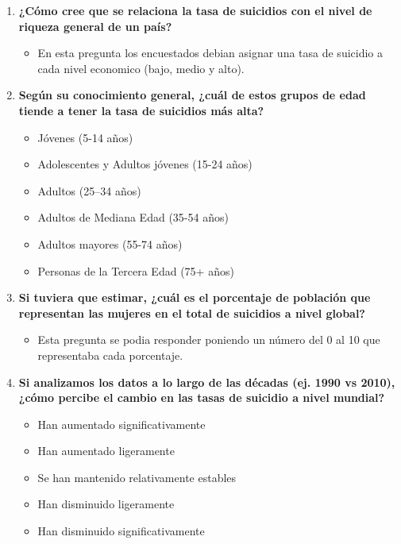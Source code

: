 \documentclass[12pt, letterpaper]{article}
\begin{document}
\begin{enumerate}
  \item \textbf{¿Cómo cree que se relaciona la tasa de suicidios con el nivel de riqueza general
        de un país?}
        \begin{itemize}[nosep]
          \item En esta pregunta los encuestados debian asignar una tasa de suicidio a cada nivel economico (bajo, medio y alto).
        \end{itemize}

  \item \textbf{Según su conocimiento general, ¿cuál de estos grupos de edad tiende a tener
        la tasa de suicidios más alta?}
        \begin{itemize}[nosep]
          \item Jóvenes (5-14 años)
          \item Adolescentes y Adultos jóvenes (15-24 años)
          \item Adultos (25--34 años)
          \item Adultos de Mediana Edad (35-54 años)
          \item Adultos mayores (55-74 años)
          \item Personas de la Tercera Edad (75+ años)
        \end{itemize}

  \item \textbf{Si tuviera que estimar, ¿cuál es el porcentaje de población que representan
        las mujeres en el total de suicidios a nivel global?}
        \begin{itemize}[nosep]
          \item Esta pregunta se podia responder poniendo un número del 0 al 10 que representaba cada porcentaje.
        \end{itemize}

  \item \textbf{Si analizamos los datos a lo largo de las décadas (ej. 1990 vs 2010), ¿cómo
        percibe el cambio en las tasas de suicidio a nivel mundial?}
        \begin{itemize}[nosep]
          \item Han aumentado significativamente
          \item Han aumentado ligeramente
          \item Se han mantenido relativamente estables
          \item Han disminuido ligeramente
          \item Han disminuido significativamente
        \end{itemize}
\end{enumerate}
\end{document}
